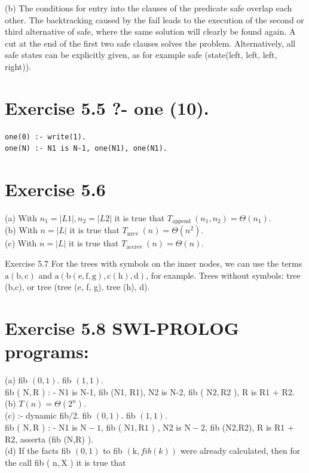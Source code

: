 \documentclass[10pt]{book}
\begin{document}
\begin{center}
\begin{enumerate}
\begin{center}
\begin{center}
\begin{center}
\begin{center}
\begin{center}
(b) The conditions for entry into the clauses of the predicate safe overlap each other. The backtracking caused by the fail leads to the execution of the second or third alternative of safe, where the same solution will clearly be found again. A cut at the end of the first two safe clauses solves the problem. Alternatively, all safe states can be explicitly given, as for example safe (state(left, left, left, right)).

\section*{Exercise 5.5 ?- one (10).}
\begin{verbatim}
one(0) :- write(1).
one(N) :- N1 is N-1, one(N1), one(N1).
\end{verbatim}

\section*{Exercise 5.6}
(a) With $n_{1}=|L 1|, n_{2}=|L 2|$ it is true that $T_{\text {append }}\left(n_{1}, n_{2}\right)=\Theta\left(n_{1}\right)$.\\
(b) With $n=|L|$ it is true that $T_{\text {nrev }}(n)=\Theta\left(n^{2}\right)$.\\
(c) With $n=|L|$ it is true that $T_{\text {accrev }}(n)=\Theta(n)$.

Exercise 5.7 For the trees with symbols on the inner nodes, we can use the terms $\mathrm{a}(\mathrm{b}, \mathrm{c})$ and $\mathrm{a}(\mathrm{b}(\mathrm{e}, \mathrm{f}, \mathrm{g}), \mathrm{c}(\mathrm{h}), \mathrm{d})$, for example. Trees without symbols: tree (b,c), or tree (tree (e, f, g), tree (h), d).

\section*{Exercise 5.8 SWI-PROLOG programs:}
(a) fib $(0,1)$. fib $(1,1)$.\\
fib ( $\mathrm{N}, \mathrm{R}$ ) : - N1 is N-1, fib (N1, R1), N2 is N-2, fib ( $\mathrm{N} 2, \mathrm{R} 2$ ), R is R1 + R2.\\
(b) $T(n)=\Theta\left(2^{n}\right)$.\\
(c) :- dynamic fib/2. fib $(0,1)$. fib $(1,1)$.\\
fib ( $\mathrm{N}, \mathrm{R}$ ) : - N1 is $\mathrm{N}-1$, fib ( $\mathrm{N} 1, \mathrm{R} 1$ ) , N2 is $\mathrm{N}-2$, fib (N2,R2), R is R1 + R2, asserta (fib (N,R) ).\\
(d) If the facts fib $(0,1)$ to fib $(\mathrm{k}, f i b(k))$ were already calculated, then for the call fib ( $\mathrm{n}, \mathrm{X}$ ) it is true that


\end{center}
\end{center}
\end{center}
\end{center}
\end{center}
\end{enumerate}
\end{center}
\end{document}
